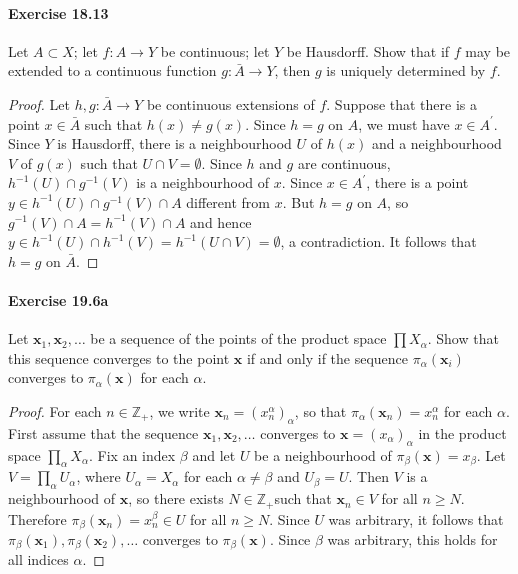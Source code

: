 \documentclass{article}
\begin{document}
\paragraph{Exercise 18.13} Let $A \subset X$; let $f: A \rightarrow Y$ be continuous; let $Y$ be Hausdorff. Show that if $f$ may be extended to a continuous function $g: \bar{A} \rightarrow Y$, then $g$ is uniquely determined by $f$.
\begin{proof}
    Let $h, g: \bar{A} \rightarrow Y$ be continuous extensions of $f$. Suppose that there is a point $x \in \bar{A}$ such that $h(x) \neq g(x)$. Since $h=g$ on $A$, we must have $x \in A^{\prime}$. Since $Y$ is Hausdorff, there is a neighbourhood $U$ of $h(x)$ and a neighbourhood $V$ of $g(x)$ such that $U \cap V=\emptyset$. Since $h$ and $g$ are continuous, $h^{-1}(U) \cap g^{-1}(V)$ is a neighbourhood of $x$. Since $x \in A^{\prime}$, there is a point $y \in h^{-1}(U) \cap g^{-1}(V) \cap A$ different from $x$. But $h=g$ on $A$, so $g^{-1}(V) \cap A=h^{-1}(V) \cap A$ and hence $y \in h^{-1}(U) \cap h^{-1}(V)=h^{-1}(U \cap V)=\emptyset$, a contradiction. It follows that $h=g$ on $\bar{A}$.
\end{proof}



\paragraph{Exercise 19.6a} Let $\mathbf{x}_1, \mathbf{x}_2, \ldots$ be a sequence of the points of the product space $\prod X_\alpha$.  Show that this sequence converges to the point $\mathbf{x}$ if and only if the sequence $\pi_\alpha(\mathbf{x}_i)$ converges to $\pi_\alpha(\mathbf{x})$ for each $\alpha$.
\begin{proof}
    For each $n \in \mathbb{Z}_{+}$, we write $\mathbf{x}_n=\left(x_n^\alpha\right)_\alpha$, so that $\pi_\alpha\left(\mathbf{x}_n\right)=x_n^\alpha$ for each $\alpha$.
First assume that the sequence $\mathbf{x}_1, \mathbf{x}_2, \ldots$ converges to $\mathbf{x}=\left(x_\alpha\right)_\alpha$ in the product space $\prod_\alpha X_\alpha$. Fix an index $\beta$ and let $U$ be a neighbourhood of $\pi_\beta(\mathbf{x})=x_\beta$. Let $V=\prod_\alpha U_\alpha$, where $U_\alpha=X_\alpha$ for each $\alpha \neq \beta$ and $U_\beta=U$. Then $V$ is a neighbourhood of $\mathbf{x}$, so there exists $N \in \mathbb{Z}_{+}$such that $\mathbf{x}_n \in V$ for all $n \geq N$. Therefore $\pi_\beta\left(\mathbf{x}_n\right)=x_n^\beta \in U$ for all $n \geq N$. Since $U$ was arbitrary, it follows that $\pi_\beta\left(\mathbf{x}_1\right), \pi_\beta\left(\mathbf{x}_2\right), \ldots$ converges to $\pi_\beta(\mathbf{x})$. Since $\beta$ was arbitrary, this holds for all indices $\alpha$.
\end{proof}
\end{document}
